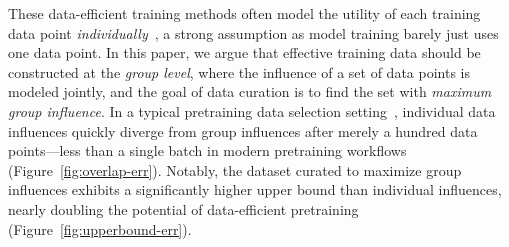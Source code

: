 These data-efficient training methods often model the utility of each training data point \textit{individually}~\cite{engstrom2024dsdm}, a strong assumption as model training barely just uses one data point. 
In this paper, we argue that effective training data should be constructed at the \textit{group level}, where the influence of a set of data points is modeled jointly, and the goal of data curation is to find the set with \textit{maximum group influence}.
In a typical pretraining data selection setting~\cite{li2024datacomp, yu2024mates}, individual data influences quickly diverge from group influences after merely a hundred data points—less than a single batch in modern pretraining workflows (Figure~\ref{fig:overlap-err}). Notably, the dataset curated to maximize group influences exhibits a significantly higher upper bound than individual influences, nearly doubling the potential of data-efficient pretraining  (Figure~\ref{fig:upperbound-err}).




